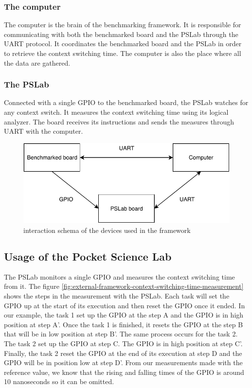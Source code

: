 \subsubsection{The computer}
The computer is the brain of the benchmarking framework.
It is responsible for communicating with both the benchmarked board and the PSLab through the UART protocol.
It coordinates the benchmarked board and the PSLab in order to retrieve the context switching time.
The computer is also the place where all the data are gathered.

\subsubsection{The PSLab}
Connected with a single GPIO to the benchmarked board, the PSLab watches for any context switch.
It measures the context switching time using its logical analyzer.
The board receives its instructions and sends the measures through UART with the computer.

\begin{figure}[!ht]
  \centering
  \includegraphics[scale=1]{assets/external-benchmarking-framework-schema.pdf}
  \caption{\label{fig:external-benchmarking-framework-schema}interaction schema of the devices used in the framework}
\end{figure}

\subsection{Usage of the Pocket Science Lab}

The PSLab monitors a single GPIO and measures the context switching time from it.
The figure \ref{fig:external-framework-context-switching-time-measurement} shows the steps in the measurement with the PSLab.
Each task will set the GPIO up at the start of its execution and then reset the GPIO once it ended.
In our example, the task 1 set up the GPIO at the step A and the GPIO is in high position at step A'.
Once the task 1 is finished, it resets the GPIO at the step B that will be in low position at step B'.
The same process occurs for the task 2.
The task 2 set up the GPIO at step C.
The GPIO is in high position at step C'.
Finally, the task 2 reset the GPIO at the end of its execution at step D and the GPIO will be in position low at step D'.
From our measurements made with the reference value, we know that the rising and falling times of the GPIO is around 10 nanoseconds so it can be omitted.

